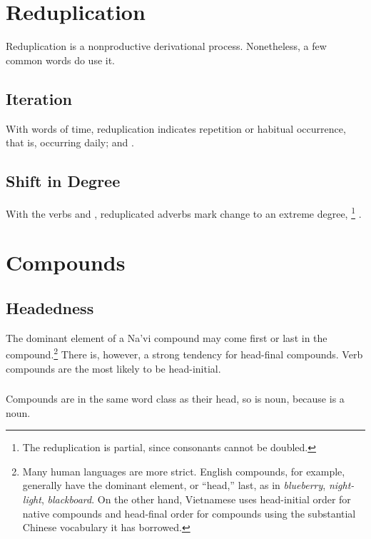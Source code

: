 \section{Reduplication}
\noindent Reduplication is a nonproductive derivational process.
Nonetheless, a few common words do use it. 

\subsection{Iteration} With words of time, reduplication indicates
repetition or habitual occurrence,   that is,
occurring daily; and  .

\subsection{Shift in Degree} With the verbs   and
 , reduplicated adverbs mark change to an extreme
degree,  
\footnote{The reduplication is partial, since consonants
cannot be doubled.} .\\

\section{Compounds}

\subsection{Headedness} The dominant element of a Na'vi compound may
come first or last in the compound.\footnote{Many human languages are
more strict.  English compounds, for example, generally have the
dominant element, or ``head,'' last, as in \textit{blueberry},
\textit{night-light}, \textit{blackboard}.  On the other hand,
Vietnamese uses head-initial order for native compounds and
head-final order for compounds using the substantial Chinese
vocabulary it has borrowed.}  There is, however, a strong tendency
for head-final compounds.  Verb compounds are the most likely to be
head-initial.

\subsubsection{} Compounds are in the same word class as their head,
so   is noun, because   is a
noun.

